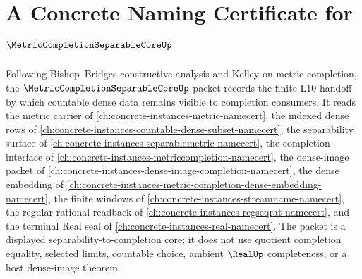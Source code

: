 \chapter{A Concrete Naming Certificate for $\MetricCompletionSeparableCoreUp$}
\label{ch:concrete-instances-metric-completion-separable-core-namecert}

Following Bishop--Bridges constructive analysis and Kelley on metric completion, the $\MetricCompletionSeparableCoreUp$ packet records the finite L10 handoff by which countable dense data remains visible to completion consumers. It reads the metric carrier of \autoref{ch:concrete-instances-metric-namecert}, the indexed dense rows of \autoref{ch:concrete-instances-countable-dense-subset-namecert}, the separability surface of \autoref{ch:concrete-instances-separablemetric-namecert}, the completion interface of \autoref{ch:concrete-instances-metriccompletion-namecert}, the dense-image packet of \autoref{ch:concrete-instances-dense-image-completion-namecert}, the dense embedding of \autoref{ch:concrete-instances-metric-completion-dense-embedding-namecert}, the finite windows of \autoref{ch:concrete-instances-streamname-namecert}, the regular-rational readback of \autoref{ch:concrete-instances-regseqrat-namecert}, and the terminal Real seal of \autoref{ch:concrete-instances-real-namecert}. The packet is a displayed separability-to-completion core; it does not use quotient completion equality, selected limits, countable choice, ambient $\RealUp$ completeness, or a host dense-image theorem.

